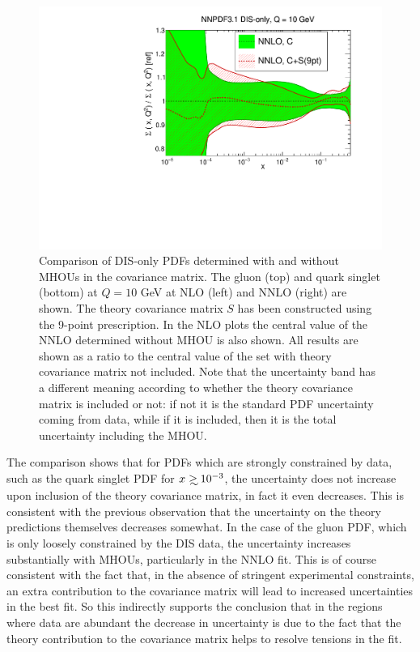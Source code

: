 \begin{figure}[t]
\begin{center}
   \includegraphics[scale=0.39]{mhous/plots/xsinglet-DISonly-NNLO-CovMatTH-EXP-vsTH.pdf}
    \caption{\small Comparison of DIS-only PDFs determined 
      with and without MHOUs in the covariance matrix.
      The gluon (top) and quark singlet (bottom) at $Q=10$ GeV
      at NLO (left) and NNLO (right) are shown.
      The theory covariance matrix $S$ has been constructed using
      the 9-point prescription.
      In the NLO plots the central value of the NNLO determined
      without MHOU is also shown. All results are shown as a ratio to
    the central value of the set with theory covariance
    matrix not included. Note that the uncertainty band has
      a different meaning according to whether the theory covariance
      matrix is included or not: if not it is the standard PDF 
      uncertainty coming from data, while if it is included, then it is the total uncertainty including the MHOU.
    \label{fig:DISonly-NLO-CovMatTH} }
  \end{center}
\end{figure}

The comparison shows that for PDFs which are strongly constrained by
data, such as the quark singlet PDF for $x\gsim 10^{-3}$, the
uncertainty does not increase upon inclusion
of the theory covariance matrix, in fact it even decreases. This is consistent with the previous
observation that the uncertainty on the theory predictions themselves decreases somewhat. 
In the case of the gluon PDF, which is only loosely constrained by the
DIS data, the uncertainty increases substantially with
MHOUs, particularly in the NNLO fit. This is of course consistent with the fact
that, in the absence of stringent experimental constraints, an extra
contribution to the covariance matrix will lead to increased
uncertainties in the best fit. So this indirectly supports the
conclusion that in the regions where data are abundant the decrease in
uncertainty is due to the fact that the theory contribution to the
covariance matrix helps to resolve tensions in the fit.

